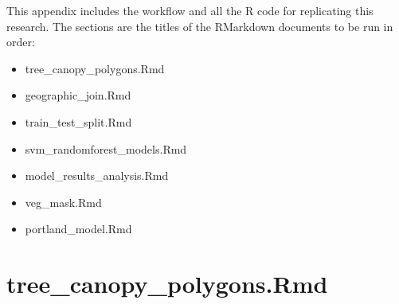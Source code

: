 \documentclass[12pt,twoside]{reedthesis}
\providecommand{\tightlist}{%
  \setlength{\itemsep}{0pt}\setlength{\parskip}{0pt}}
\begin{document}
This appendix includes the workflow and all the R code for replicating this research. The sections are the titles of the RMarkdown documents to be run in order:
\begin{itemize}
\tightlist
\item
  tree\_canopy\_polygons.Rmd
\item
  geographic\_join.Rmd
\item
  train\_test\_split.Rmd
\item
  svm\_randomforest\_models.Rmd
\item
  model\_results\_analysis.Rmd
\item
  veg\_mask.Rmd
\item
  portland\_model.Rmd
\end{itemize}
\hypertarget{tree_canopy_polygons.rmd}{%
\section{tree\_canopy\_polygons.Rmd}\label{tree_canopy_polygons.rmd}}
\end{document}
